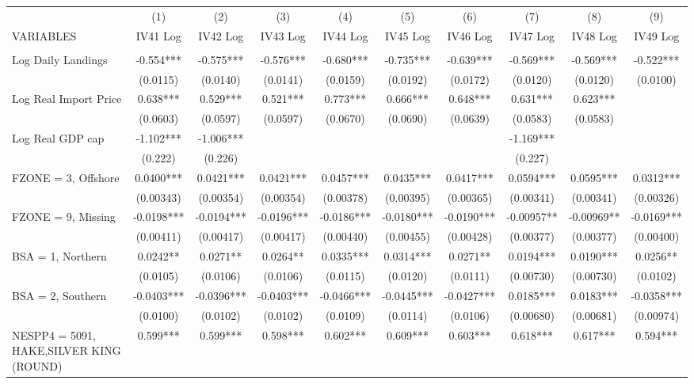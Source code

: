 \begin{tabular}{lccccccccc} \hline
 & (1) & (2) & (3) & (4) & (5) & (6) & (7) & (8) & (9) \\
VARIABLES & IV41 Log & IV42 Log & IV43 Log & IV44 Log & IV45 Log & IV46 Log & IV47 Log & IV48 Log & IV49 Log \\ \hline
 &  &  &  &  &  &  &  &  &  \\
Log Daily Landings & -0.554*** & -0.575*** & -0.576*** & -0.680*** & -0.735*** & -0.639*** & -0.569*** & -0.569*** & -0.522*** \\
 & (0.0115) & (0.0140) & (0.0141) & (0.0159) & (0.0192) & (0.0172) & (0.0120) & (0.0120) & (0.0100) \\
Log Real Import Price & 0.638*** & 0.529*** & 0.521*** & 0.773*** & 0.666*** & 0.648*** & 0.631*** & 0.623*** &  \\
 & (0.0603) & (0.0597) & (0.0597) & (0.0670) & (0.0690) & (0.0639) & (0.0583) & (0.0583) &  \\
Log Real GDP cap & -1.102*** & -1.006*** &  &  &  &  & -1.169*** &  &  \\
 & (0.222) & (0.226) &  &  &  &  & (0.227) &  &  \\
FZONE = 3, Offshore & 0.0400*** & 0.0421*** & 0.0421*** & 0.0457*** & 0.0435*** & 0.0417*** & 0.0594*** & 0.0595*** & 0.0312*** \\
 & (0.00343) & (0.00354) & (0.00354) & (0.00378) & (0.00395) & (0.00365) & (0.00341) & (0.00341) & (0.00326) \\
FZONE = 9, Missing & -0.0198*** & -0.0194*** & -0.0196*** & -0.0186*** & -0.0180*** & -0.0190*** & -0.00957** & -0.00969** & -0.0169*** \\
 & (0.00411) & (0.00417) & (0.00417) & (0.00440) & (0.00455) & (0.00428) & (0.00377) & (0.00377) & (0.00400) \\
BSA = 1, Northern & 0.0242** & 0.0271** & 0.0264** & 0.0335*** & 0.0314*** & 0.0271** & 0.0194*** & 0.0190*** & 0.0256** \\
 & (0.0105) & (0.0106) & (0.0106) & (0.0115) & (0.0120) & (0.0111) & (0.00730) & (0.00730) & (0.0102) \\
BSA = 2, Southern & -0.0403*** & -0.0396*** & -0.0403*** & -0.0466*** & -0.0445*** & -0.0427*** & 0.0185*** & 0.0183*** & -0.0358*** \\
 & (0.0100) & (0.0102) & (0.0102) & (0.0109) & (0.0114) & (0.0106) & (0.00680) & (0.00681) & (0.00974) \\
NESPP4 = 5091, HAKE,SILVER KING (ROUND) & 0.599*** & 0.599*** & 0.598*** & 0.602*** & 0.609*** & 0.603*** & 0.618*** & 0.617*** & 0.594*** \\

\end{tabular}
